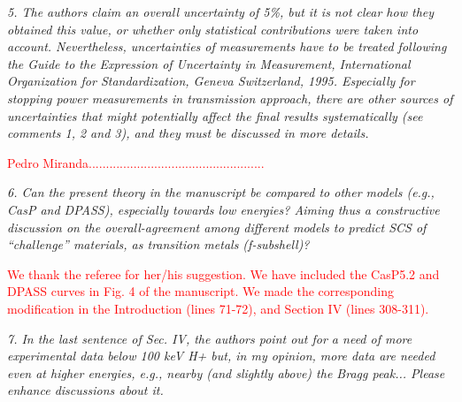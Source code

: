\documentclass[a4paper,10pt]{article}
\def\reviewer#1{\vspace{0.35cm}\textsl{#1}}
\def\reply#1{\vspace{0.1cm}\textcolor{red}{#1}}
\begin{document}
\reviewer{5. The authors claim an overall uncertainty of 5\%, but it is 
not clear how they obtained this value, or whether only statistical
contributions were taken into account. Nevertheless, uncertainties of
measurements have to be treated following the Guide to the Expression
of Uncertainty in Measurement, International Organization for
Standardization, Geneva Switzerland, 1995. Especially for stopping
power measurements in transmission approach, there are other sources
of uncertainties that might potentially affect the final results
systematically (see comments 1, 2 and 3), and they must be discussed
in more details.}

\reply{Pedro Miranda...................................................}

\reviewer{6. Can the present theory in the manuscript be compared to 
other models (e.g., CasP and DPASS), especially towards low energies? 
Aiming thus a constructive discussion on the overall-agreement among
different models to predict SCS of “challenge” materials, as transition 
metals (f-subshell)?}

\reply{We thank the referee for her/his suggestion. We have included the 
CasP5.2 and DPASS curves in Fig. 4 of the manuscript. We made the 
corresponding modification in the Introduction (lines 71-72), and 
Section IV (lines 308-311).}

\reviewer{7. In the last sentence of Sec. IV, the authors point out for 
a need of more experimental data below 100 keV H+ but, in my opinion, 
more data are needed even at higher energies, e.g., nearby (and slightly
above) the Bragg peak... Please enhance discussions about it.}
\end{document}
